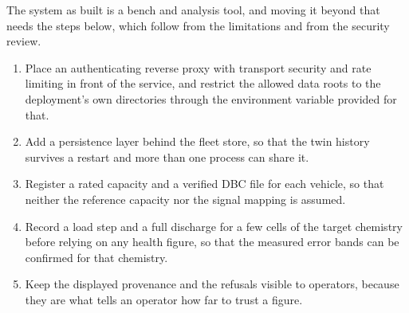 The system as built is a bench and analysis tool, and moving it beyond that needs the steps below, which follow from the limitations and from the security review.
\begin{enumerate}
	\item Place an authenticating reverse proxy with transport security and rate limiting in front of the service, and restrict the allowed data roots to the deployment's own directories through the environment variable provided for that.
	\item Add a persistence layer behind the fleet store, so that the twin history survives a restart and more than one process can share it.
	\item Register a rated capacity and a verified DBC file for each vehicle, so that neither the reference capacity nor the signal mapping is assumed.
	\item Record a load step and a full discharge for a few cells of the target chemistry before relying on any health figure, so that the measured error bands can be confirmed for that chemistry.
	\item Keep the displayed provenance and the refusals visible to operators, because they are what tells an operator how far to trust a figure.
\end{enumerate}
